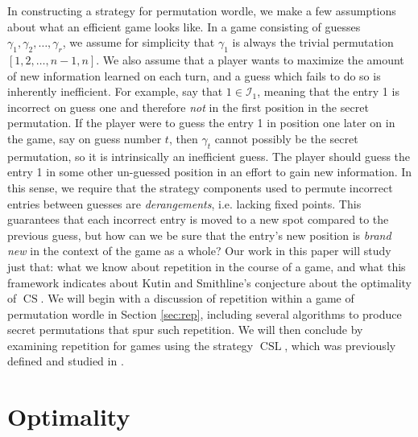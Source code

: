 \documentclass[article]{amsart}
\theoremstyle{plain}
\DeclareMathOperator{\CS}{CS}
\DeclareMathOperator{\CSL}{CSL}
\begin{document}
In constructing a strategy for permutation wordle, we make a few assumptions about what an efficient game looks like. In a game consisting of guesses $\gamma_1, \gamma_2, \dots, \gamma_r$, we assume for simplicity that $\gamma_1$ is always the trivial permutation $[1,2,\dots, n-1,n]$. We also assume that a player wants to maximize the amount of new information learned on each turn, and a guess which fails to do so is inherently inefficient. %
For example, say that $1 \in \mathcal{I}_1$, meaning that the entry 1 is incorrect on guess one and therefore \textit{not} in the first position in the secret permutation. If the player were to guess the entry 1 in position one later on in the game, say on guess number $t$, then $\gamma_t$ cannot possibly be the secret permutation, so it is intrinsically an inefficient guess. The player should guess the entry 1 in some other un-guessed position in an effort to gain new information. In this sense, we require that the strategy components used to permute incorrect entries between guesses are \textit{derangements}, i.e. lacking fixed points. This guarantees that each incorrect entry is moved to a new spot compared to the previous guess, but how can we be sure that the entry's new position is \textit{brand new} in the context of the game as a whole? Our work in this paper will study just that: what we know about repetition in the course of a game, and what this framework indicates about Kutin and Smithline's conjecture about the optimality of $\CS$. %
We will begin with a discussion of repetition within a game of permutation wordle in Section \ref{sec:rep}, including several algorithms to produce secret permutations that spur such repetition. We will then conclude by examining repetition for games using the strategy $\CSL$, which was previously defined and studied in \cite{hiveley2025}.

\iffalse
\section{Optimality} \label{sec:opt}
\end{document}
